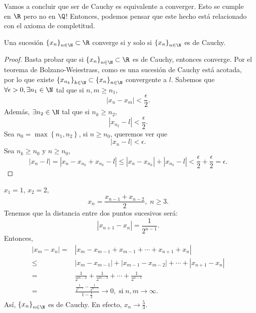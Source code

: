 \begin{observation}
\normalfont Vamos a concluir que ser de Cauchy es equivalente a converger. Esto se cumple en $\displaystyle \R $ pero no en $\displaystyle \Q $! Entonces, podemos pensar que este hecho está relacionado con el axioma de completitud.
\end{observation}

\begin{ftheorem}
	\normalfont Una sucesión $\displaystyle \left\{ x_{n}\right\} _{n\in\N} \subset \R$ converge si y solo si $\displaystyle \left\{ x_{n}\right\} _{n\in\N} $ es de Cauchy.
\end{ftheorem}

\begin{proof}
	Basta probar que si $\displaystyle \left\{ x_{n}\right\} _{n\in\N} \subset \R$ es de Cauchy, entonces converge. Por el teorema de Bolzano-Weiestrass, como es una sucesión de Cauchy está acotada, por lo que existe $\displaystyle \left\{ x_{n_{k}}\right\} _{k\in\N} \subset \left\{ x_{n}\right\} _{n\in\N} $ convergente a $\displaystyle l $. Sabemos que $\displaystyle \forall \epsilon > 0, \exists n_{1} \in \N $ tal que si $\displaystyle n, m \geq n_{1} $,
	\[ \left|x_{n}-x_{m}\right| < \frac{\epsilon }{2} .\]
Además, $\displaystyle \exists n_{2} \in \N $ tal que si $\displaystyle n_{k} \geq n_{2} $,
\[ \left|x_{n_{2}}-l\right| < \frac{\epsilon }{2} .\]
Sea $\displaystyle n_{0} = \max \left\{ n_{1}, n_{2}\right\}  $, si $\displaystyle n \geq n_{0} $, queremos ver que
\[ \left|x_{n}-l\right|<\epsilon.\]
Sea $\displaystyle n_{k} \geq n_{0} $ y $\displaystyle n \geq n_{0} $,
\[ \left|x_{n}-l\right| = \left|x_{n}-x_{n_{k}}+x_{n_{k}}-l\right| \leq \left|x_{n}-x_{n_{k}}\right| + \left|x_{n_{k}}-l\right| < \frac{\epsilon }{2} + \frac{\epsilon }{2} = \epsilon .\]
\end{proof}

\begin{eg}
\normalfont $\displaystyle x_{1} = 1 $, $\displaystyle x_{2} = 2 $, 
\[x_{n} = \frac{x_{n-1}+x_{n-2}}{2}, \; n\geq 3 .\]
Tenemos que la distancia entre dos puntos sucesivos será:
\[ \left|x_{n+1}-x_{n}\right| = \frac{1}{2^{n-1}}.\]
Entonces, 
\[
\begin{split}
	\left|x_{m}-x_{n}\right| = & \left|x_{m}-x_{m -1} + x_{m -1} + \cdots + x_{n+1} + x_{n}\right| \\
	\leq & \left|x_{m}-x_{m -1}\right| + \left|x_{m -1} - x_{m -2}\right| + \cdots + \left|x_{n+1}-x_{n}\right| \\
	= & \frac{1}{2^{m -2}} + \frac{1}{2^{m -3}}+ \cdots + \frac{1}{2^{n-1}} \\
	= & \frac{\frac{1}{2^{n-1}}-\frac{1}{2^{m -1}}}{1 - \frac{1}{2}} \to 0, \; \text{si} \; n,m \to \infty.
\end{split}
\]
Así, $\displaystyle \left\{ x_{n}\right\} _{n\in\N} $ es de Cauchy. En efecto, $\displaystyle x_{n} \to \frac{5}{3} $.
\end{eg}

